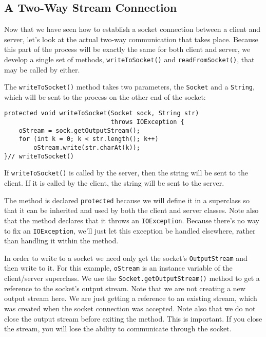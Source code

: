 \subsection{A Two-Way Stream Connection}
\noindent Now that we have seen how to establish a socket connection between a
client and server, let's look at the actual two-way communication that
takes place.  Because this part of the process will be exactly the same
for both client and server, we develop a single set of methods,
{\tt writeToSocket()} and {\tt readFromSocket()}, that may be called by
either.

The {\tt writeToSocket()} method takes two parameters, the
{\tt Socket} and a {\tt String}, which will be sent to the
process on the other end of the socket:

\begin{jjjlisting}
\begin{lstlisting}
protected void writeToSocket(Socket sock, String str) 
                             throws IOException {
    oStream = sock.getOutputStream();
    for (int k = 0; k < str.length(); k++)
        oStream.write(str.charAt(k));
}// writeToSocket()
\end{lstlisting}
\end{jjjlisting}


\noindent If {\tt writeToSocket()} is called by the server, then
the string will be sent to the client.  If it is called by the client,
the string will be sent to the server.

The method is declared {\tt protected} because we will define it in a
super\-class so that it can be inherited and used by both the client and
server classes.  Note also that the method declares that it throws an
{\tt IOException}. Because there's no way to fix an {\tt IOException},
we'll just let this exception be handled elsewhere, rather than
handling it within the method.

In order to write to a socket we need only get the socket's
{\tt OutputStream} and then write to it.  For this example, {\tt oStream} is
an instance variable of the client/server superclass.   We use the
{\tt Socket.getOutputStream()} method to get a reference to the socket's
output stream.  Note that we are not creating a new output stream
here.  We are just getting a reference to an existing stream, which was
created when the socket connection was accepted.   Note also that we do
not close the output stream before exiting the method.   This is
important.  If you close the stream, you will lose the ability to
communicate through the socket.

